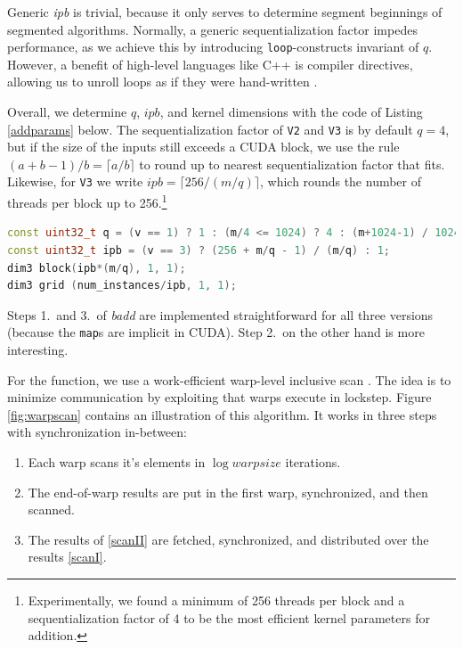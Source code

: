 Generic \textit{ipb} is trivial, because it only serves to determine segment
beginnings of segmented algorithms. Normally, a generic sequentialization factor
impedes performance, as we achieve this by introducing \texttt{loop}-constructs
invariant of $q$. However, a benefit of high-level languages like C++ is
compiler directives, allowing us to unroll loops as if they were hand-written
\cite{cudaguide}.

Overall, we determine $q$, $\mathit{ipb}$, and kernel dimensions with the code
of Listing \ref{addparams} below. The sequentialization factor of \texttt{V2}
and \texttt{V3} is by default $q=4$, but if the size of the inputs still exceeds
a CUDA block, we use the rule $(a + b - 1) / b = \lceil a / b \rceil$ to round up to
nearest sequentialization factor that fits. Likewise, for \texttt{V3} we write
$\mathit{ipb} = \lceil 256 / (m/q) \rceil$, which rounds the number of threads per block
up to 256.\footnote{Experimentally, we found a minimum of 256 threads per block
  and a sequentialization factor of 4 to be the most efficient kernel parameters
  for addition.}


\begin{lstlisting}[language=CPP,caption={\footnotesize CUDA addition parameters and kernel dimensions for version $v$ with size $m$ and $\mathit{num\_instances}$.},label={addparams}]
const uint32_t q = (v == 1) ? 1 : (m/4 <= 1024) ? 4 : (m+1024-1) / 1024;
const uint32_t ipb = (v == 3) ? (256 + m/q - 1) / (m/q) : 1;
dim3 block(ipb*(m/q), 1, 1);
dim3 grid (num_instances/ipb, 1, 1);
\end{lstlisting}

Steps 1.\ and 3.\ of \textit{badd} are implemented straightforward for all three
versions (because the \texttt{map}s are implicit in CUDA). Step 2.\ on the other
hand is more interesting.

For the  function, we use a work-efficient warp-level inclusive scan
\cite{warpscan}. The idea is to minimize communication by exploiting that warps
execute in lockstep. Figure \ref{fig:warpscan} contains an illustration of this
algorithm. It works in three steps with synchronization in-between:
\begin{enumerate}[label=\Roman*]
\item Each warp scans it's elements in $\log \mathit{warpsize}$ iterations.\label{scanI}
\item The end-of-warp results are put in the first warp, synchronized, and then
  scanned.\label{scanII}
\item The results of \ref{scanII} are fetched, synchronized, and distributed over the
  results \ref{scanI}.
\end{enumerate}

